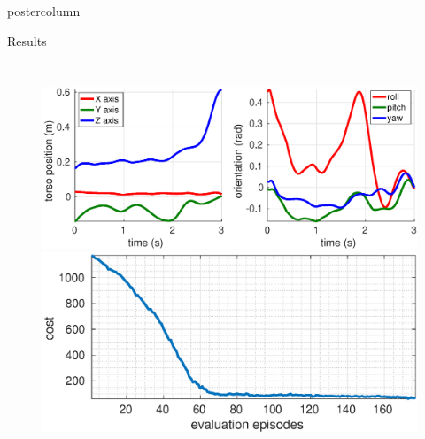 \documentclass{beamer}
\begin{document}
\begin{frame}
\begin{columns}
\begin{column}{.4\textwidth}
\begin{beamercolorbox}[center]{postercolumn}
\begin{minipage}{.98\textwidth}
{\begin{myblock}{Results}
\begin{columns}
	\begin{figure}[t!]
	\centering
	  \vspace*{-5mm}
	  \includegraphics[width=\linewidth]{sr_solution_1_ICRA.eps} \\
	  \vspace*{3mm}
	  \includegraphics[width=\linewidth, height=0.155\textheight]{sr_cost_1_ICRA.eps}
	\label{fig:sr_behaviour}
	\end{figure}	
	
	\end{columns}
	

	





\end{myblock}}
\end{minipage}
\end{beamercolorbox}
\end{column}
\end{columns}
\end{frame}
\end{document}
